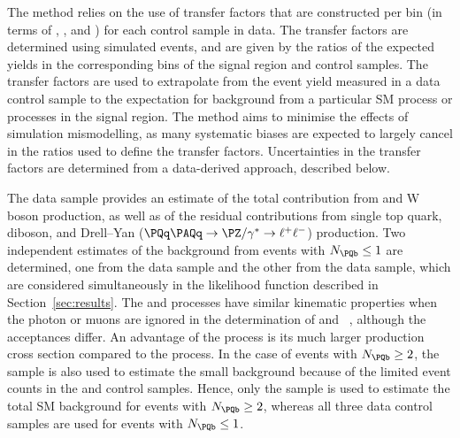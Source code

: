 The method relies on the use of transfer factors that are constructed
per bin (in terms of \njet, \nb, and \scalht) for each control sample
in data. The transfer factors are determined using simulated events,
and are given by the ratios of the expected yields in the
corresponding bins of the signal region and control samples. The
transfer factors are used to extrapolate from the event yield measured
in a data control sample to the expectation for background from a
particular SM process or processes in the signal region. The method
aims to minimise the effects of simulation mismodelling, as many
systematic biases are expected to largely cancel in the ratios used to
define the transfer factors. Uncertainties in the transfer factors are
determined from a data-derived approach, described below.

The \mj data sample provides an estimate of the total contribution
from \ttbar and W boson production, as well as of the residual
contributions from single top quark, diboson, and Drell--Yan
($\PQq\PAQq \to \PZ/\gamma^* \to \ell^+\ell^-$) production. Two
independent estimates of the background from \znunujets events with
$\nb \leq 1$ are determined, one from the \gj data sample and the
other from the \mmj data sample, which are considered simultaneously
in the likelihood function described in Section~\ref{sec:results}. The
\gj and \zmumujets processes have similar kinematic properties when
the photon or muons are ignored in the determination of \ETmiss and
\HTmiss~\cite{Bern:2011pa}, although the acceptances differ. An
advantage of the \gj process is its much larger production cross
section compared to the \znunujets process. In the case of events with
$\nb \geq 2$, the \mj sample is also used to estimate the small
\znunujets background because of the limited event counts in the \mmj
and \gj control samples. Hence, only the \mj sample is used to
estimate the total SM background for events with $\nb \geq 2$, whereas
all three data control samples are used for events with $\nb \leq 1$.

